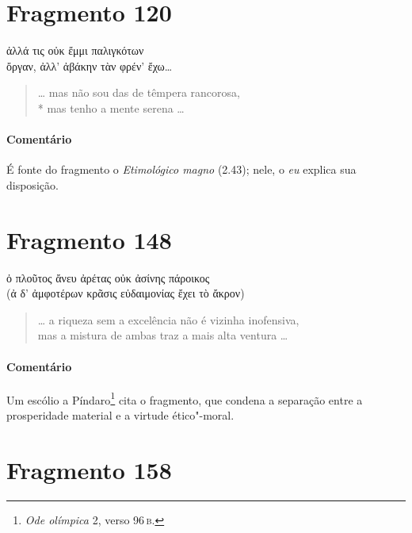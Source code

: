 {\section{Fragmento 120}

\begin{gkverse}
ἀλλά τις οὐκ ἔμμι παλιγκότων\\
ὄργαν, ἀλλ’ ἀβάκην τὰν φρέν’ ἔχω\ldots{}
\end{gkverse}

\begin{verse}
\ldots{} mas não sou das de têmpera rancorosa,\\*
mas tenho a mente serena \ldots{}
\end{verse}

\medskip

{\paragraph{Comentário} É fonte do fragmento o \textit{Etimológico magno} (2.43); nele, o \textit{eu} explica sua disposição.}


\section{Fragmento 148}

\begin{gkverse}
ὀ πλοῦτος ἄνευ ἀρέτας οὐκ ἀσίνης πάροικος\\
(ἀ δ’ ἀμφοτέρων κρᾶσις \dagger{}εὐδαιμονίας ἔχει τὸ ἄκρον\dagger{})
\end{gkverse}

\begin{verse}
\ldots{} a riqueza sem a excelência não é vizinha inofensiva,\\
mas a mistura de ambas traz a mais alta ventura \ldots{}
\end{verse}

\medskip

{\paragraph{Comentário} Um escólio a Píndaro\footnote{\textit{Ode olímpica} 2, verso 96\,\textsc{b}.} cita o fragmento,
que condena a separação entre a prosperidade material e a virtude ético"-moral.}

\pagebreak
\section{Fragmento 158}

}
